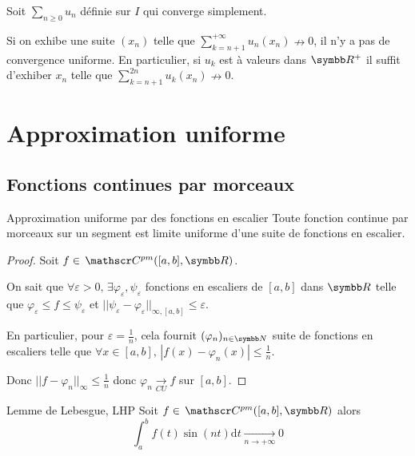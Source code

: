 \begin{proposition}{}{}
    Soit $\sum_{n \geqslant 0} u_n$ définie sur $I$ qui converge simplement. 

    Si on exhibe une suite $(x_n)$ telle que $\displaystyle \sum_{k = n + 1 }^{+ \infty  } u_n(x_n) \nrightarrow 0$,
    il n'y a pas de convergence uniforme. En particulier, si $u_k$ est à valeurs dans $\R^+$ il suffit 
    d'exhiber $x_n$ telle que $\displaystyle \sum_{k = n + 1}^{2n} u_k(x_n) \nrightarrow 0$.
\end{proposition}


\section{Approximation uniforme }
\subsection{Fonctions continues par morceaux }

\begin{theorement}{Approximation uniforme par des fonctions en escalier}{}
    Toute fonction continue par morceaux sur un segment est limite uniforme d'une suite 
    de fonctions en escalier. 
\end{theorement}

\begin{proof}
    Soit $f \in \mc{pm} ([a, b], \R)$. 

    On sait que $\forall \varepsilon > 0, \, \exists \varphi_\varepsilon, \psi_\varepsilon$ fonctions en escaliers 
    de $[a, b]$ dans $\R$ telle que $\varphi_\varepsilon \leqslant f \leqslant \psi_\varepsilon$ et
    $||\psi_\varepsilon - \varphi_\varepsilon||_{\infty, [a, b]} \leqslant \varepsilon$.

    En particulier, pour $\varepsilon = \frac 1 n$, cela fournit $(\varphi_n)_{n \in \N}$ suite de 
    fonctions en escaliers telle que $\forall x \in [a, b], \, | f(x) - \varphi_n(x) | \leqslant \frac 1 n$.

    Donc $||f - \varphi_n||_\infty \leqslant \frac 1 n $ donc $\varphi_n \xrightarrow[CU]{} f$ sur $[a, b]$.
\end{proof}


\begin{proposition}{Lemme de Lebesgue, LHP}{}
    Soit $f \in \mc{pm}([a, b], \R)$ alors 
    $$\int_a^b f(t) \sin(nt) \mathrm d t \xrightarrow[n \to + \infty ]{} 0$$
\end{proposition}

